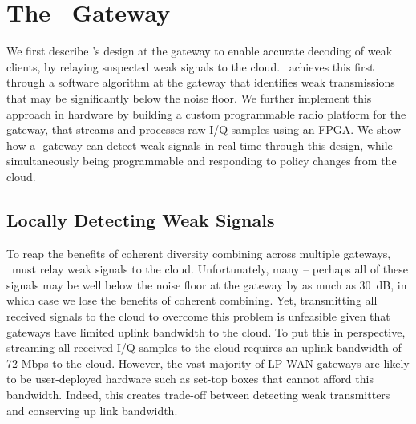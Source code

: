 \section{The \name\ Gateway}
\label{sec:gateway}



We first describe \name's design at the gateway to enable accurate decoding of weak clients, by relaying suspected weak signals to the cloud. \name\ achieves this first through a software algorithm at the gateway that identifies weak transmissions that may be significantly below the noise floor. We further implement this approach in hardware by building a custom programmable radio platform for the gateway, that streams and processes raw I/Q samples using an FPGA. We show how a \name-gateway can detect weak signals in real-time through this design, while simultaneously being programmable and responding to policy changes from the cloud. 

\subsection{Locally Detecting Weak Signals}
\label{sec:local-detection}
To reap the benefits of coherent diversity combining across multiple gateways, \name\ must relay weak signals to the cloud. Unfortunately, many -- perhaps all of these signals may be well below the noise floor at the gateway by as much as 30~dB, in which case we lose the benefits of coherent combining. Yet, transmitting all received signals to the cloud to overcome this problem is unfeasible given that gateways have limited uplink bandwidth to the cloud. To put this in perspective, streaming all received I/Q samples to the cloud requires an uplink bandwidth of 72 Mbps to the cloud. However, the vast majority of LP-WAN gateways are likely to be user-deployed hardware such as set-top boxes that cannot afford this bandwidth. Indeed, this creates  trade-off between detecting weak transmitters and conserving up link bandwidth.

